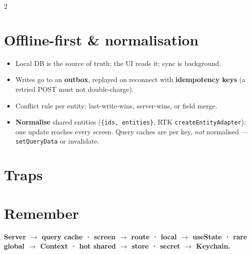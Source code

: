 \documentclass[8pt]{extarticle}
\begin{document}
\begin{multicols}{2}
\section{Offline-first \& normalisation}
\begin{itemize}
  \item Local DB is the source of truth; the UI reads it; sync is background.
  \item Writes go to an \textbf{outbox}, replayed on reconnect with
        \textbf{idempotency keys} (a retried POST must not double-charge).
  \item Conflict rule per entity: last-write-wins, server-wins, or field merge.
  \item \textbf{Normalise} shared entities (\texttt{\{ids, entities\}}, RTK
        \texttt{createEntityAdapter}): one update reaches every screen. Query caches
        are per key, \emph{not} normalised — \texttt{setQueryData} or invalidate.
\end{itemize}

\section{Traps}
\begin{itemize}
\end{itemize}

\section{Remember}
\textbf{Server $\to$ query cache · screen $\to$ route · local $\to$ useState · rare
global $\to$ Context · hot shared $\to$ store · secret $\to$ Keychain.}


\end{multicols}

\end{document}
